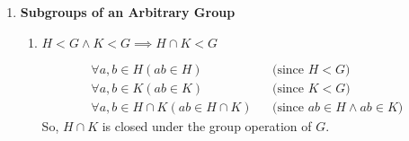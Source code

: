 \begin{enumerate}[label={\Alph*.},font={\bfseries}]
\begin{enumerate}[label={\arabic*},font={\bfseries}]
\begin{proof}
      \begin{align*}
        a\inv &= (c^2)\inv \\
        &= (c\inv)^2
      \end{align*}
      So, $H$ is closed under the inverse operation of $G$.
    \end{proof}
  \item
    \begin{theorem}
      $H < G \land K = \Set{x \in G : x^2 \in H} \implies K < G$
    \end{theorem}
    \begin{proof}
      Let $a, b \in K$, so $a = c^2$ and $b = d^2$, and $c^2, d^2 \in G$.
      \begin{align*}
        ab &= c^2d^2 \\
        &= (cd)^2 && \text{(since $G$ is abelian)}
      \end{align*}
      So, $K$ is closed under the group operation of $G$.

      \begin{align*}
        a\inv &= (c^2)\inv \\
        &= (c\inv)^2
      \end{align*}
      So, $K$ is closed under the inverse operation of $G$.
    \end{proof}
  \item {}
  \item {}
  \item {}
  \end{enumerate}
\item {\bf Subgroups of an Arbitrary Group}
  \begin{enumerate}[label={\arabic*},font={\bfseries}]
  \item
    \begin{theorem}
      $H < G \land K < G \implies H \cap K < G$
    \end{theorem}

    \begin{align*}
      \forall a,b \in H(ab \in H) && \text{(since $H < G$)} \\
      \forall a,b \in K(ab \in K) && \text{(since $K < G$)} \\
      \forall a, b \in H \cap K(ab \in H \cap K) && \text{(since $ab \in H \land ab \in K$)}
    \end{align*}
    So, $H \cap K$ is closed under the group operation of $G$.


\end{enumerate}
\end{enumerate}
